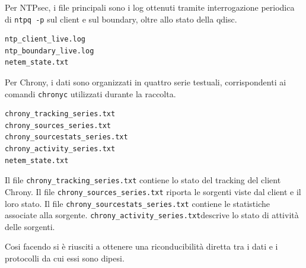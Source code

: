 Per NTPsec, i file principali sono i log ottenuti tramite interrogazione periodica
di \texttt{ntpq -p} sul client e sul boundary, oltre allo stato della qdisc.

\begin{lstlisting}[caption={File prodotti da una run NTPsec.},label={lst:auto-ntpsec-files}]
ntp_client_live.log
ntp_boundary_live.log
netem_state.txt
\end{lstlisting}

Per Chrony, i dati sono organizzati in quattro serie testuali, corrispondenti ai
comandi \texttt{chronyc} utilizzati durante la raccolta.

\begin{lstlisting}[caption={File prodotti da una run Chrony.},label={lst:auto-chrony-files-list}]
chrony_tracking_series.txt
chrony_sources_series.txt
chrony_sourcestats_series.txt
chrony_activity_series.txt
netem_state.txt
\end{lstlisting}

Il file \texttt{chrony\_tracking\_series.txt} contiene lo stato del tracking del client Chrony. 
\newline
Il file \texttt{chrony\_sources\_series.txt} riporta le sorgenti viste dal client e il loro stato. 
\newline
Il file \texttt{chrony\_sourcestats\_series.txt} contiene le statistiche associate alla sorgente.
\newline
\texttt{chrony\_activity\_series.txt}descrive lo stato di attività delle sorgenti.

Cosi facendo si è riusciti a ottenere una riconducibilità diretta tra i dati e i protocolli
da cui essi sono dipesi.